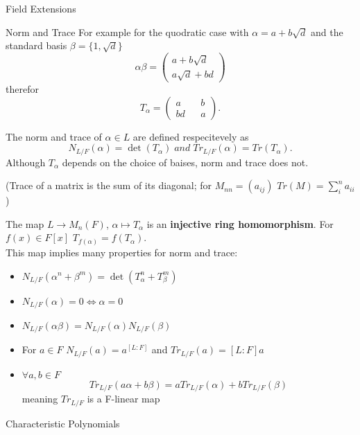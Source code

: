 \documentclass[12pt, letterpaper]{article}
\begin{document}
\begin{section}{Field Extensions}
\begin{subsection}{Norm and Trace}
    For example for the quodratic case with \(\alpha = a + b \sqrt{d}\) and the
    standard basis \(\beta = \{ 1, \sqrt{d} \}\) \[\alpha \beta =
      \begin{pmatrix} a + b \sqrt{d} \\ a \sqrt{d} + bd \end{pmatrix}\] therefor
    \[T_{\alpha} = \begin{pmatrix} a && b \\ bd && a \end{pmatrix}.\]

    The norm and trace of \(\alpha \in L\) are defined respecitevely as
    \[N_{L / F}(\alpha) = \det(T_{\alpha}) \; and \; Tr_{L / F}(\alpha) =
      Tr(T_{\alpha}).\]
    Although \(T_{\alpha}\) depends on the choice of baises, norm and trace
    does not.

    (Trace of a matrix is the sum of its diagonal; for \(M_{nn} = (a_{ij})\)
    \(Tr(M) = \sum^{n}_{i} a_{ii}\))

    The map \(L \to M_{n}(F)\), \(\alpha \mapsto T_{\alpha}\) is an
    \textbf{injective ring homomorphism}. For \(f(x) \in F[x]\)
    \(T_{f(\alpha)} = f(T_{\alpha})\). \\
    This map implies many properties for norm and trace:
    \begin{itemize}
      \item \(N_{L / F}(\alpha^{n} + \beta^{m}) = \det(T_{\alpha}^{n} +
            T_{\beta}^{m})\)
      \item \(N_{L / F}(\alpha) = 0 \iff \alpha = 0\)
      \item \(N_{L / F}(\alpha \beta) = N_{L / F}(\alpha) N_{L / F}(\beta)\)
      \item For \(a \in F\) \(N_{L / F}(a) = a^{[L : F]}\) and
            \(Tr_{L / F}(a) = [L : F] a\)
      \item \(\forall a, b \in F\)
            \[Tr_{L / F}(a \alpha + b \beta) = a Tr_{L / F}(\alpha) +
            b Tr_{L / F}(\beta)\] meaning \(Tr_{L / F}\) is a F-linear map
    \end{itemize}


  \end{subsection}

  \begin{subsection}{Characteristic Polynomials}


\end{subsection}
\end{section}
\end{document}
